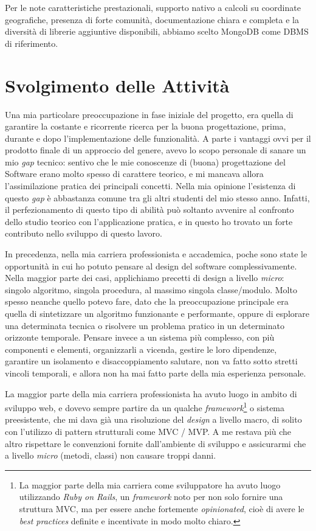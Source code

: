 \documentclass[12pt]{report}
\begin{document}
Per le note caratteristiche prestazionali, supporto nativo a calcoli su coordinate geografiche, presenza di forte comunità, documentazione chiara e completa e la diversità di librerie aggiuntive disponibili, abbiamo scelto MongoDB come DBMS di riferimento.

% 
% 
\chapter{Svolgimento delle Attività}
\label{cap3}

Una mia particolare preoccupazione in fase iniziale del progetto, era quella di garantire la costante e ricorrente ricerca per la buona progettazione, prima, durante e dopo l'implementazione delle funzionalità. A parte i vantaggi ovvi per il prodotto finale di un approccio del genere, avevo lo scopo personale di sanare un mio \textit{gap} tecnico: sentivo che le mie conoscenze di (buona) progettazione del Software erano molto spesso di carattere teorico, e mi mancava allora l'assimilazione pratica dei principali concetti. Nella mia opinione l'esistenza di questo \textit{gap} è abbastanza comune tra gli altri studenti del mio stesso anno. Infatti, il perfezionamento di questo tipo di abilità può soltanto avvenire al confronto dello studio teorico con l'applicazione pratica, e in questo ho trovato un forte contributo nello sviluppo di questo lavoro.

In precedenza, nella mia carriera professionista e accademica, poche sono state le opportunità in cui ho potuto pensare al design del software complessivamente. Nella maggior parte dei casi, applichiamo precetti di design a livello \textit{micro}: singolo algoritmo, singola procedura, al massimo singola classe/modulo. Molto spesso neanche quello potevo fare, dato che la preoccupazione principale era quella di sintetizzare un algoritmo funzionante e performante, oppure di esplorare una determinata tecnica o risolvere un problema pratico in un determinato orizzonte temporale. Pensare invece a un sistema più complesso, con più componenti e elementi, organizzarli a vicenda, gestire le loro dipendenze, garantire un isolamento e disaccoppiamento salutare, non va fatto sotto stretti vincoli temporali, e allora non ha mai fatto parte della mia esperienza personale. 

La maggior parte della mia carriera professionista ha avuto luogo in ambito di sviluppo web, e dovevo sempre partire da un qualche \textit{framework}\footnote{
La maggior parte della mia carriera come sviluppatore ha avuto luogo utilizzando \textit{Ruby on Rails}, un \textit{framework} noto per non solo fornire una struttura MVC, ma per essere anche fortemente \textit{opinionated}, cioè di avere le \textit{best practices} definite e incentivate in modo molto chiaro.} 
o sistema preesistente, che mi dava già una risoluzione del \textit{design} a livello macro, di solito con l'utilizzo di pattern strutturali come MVC / MVP. A me restava più che altro rispettare le convenzioni fornite dall'ambiente di sviluppo e assicurarmi che a livello \textit{micro} (metodi, classi) non causare troppi danni.
\end{document}
